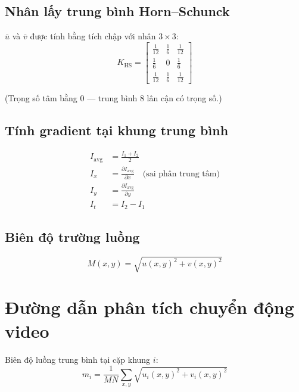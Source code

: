 \documentclass[12pt, a4paper]{article}
\begin{document}
\subsection{Nhân lấy trung bình Horn--Schunck}

$\bar{u}$ và $\bar{v}$ được tính bằng tích chập với nhân $3\times 3$:
\begin{equation}
  K_{\mathrm{HS}} =
  \begin{bmatrix}
    \tfrac{1}{12} & \tfrac{1}{6} & \tfrac{1}{12} \\[4pt]
    \tfrac{1}{6}  & 0            & \tfrac{1}{6}  \\[4pt]
    \tfrac{1}{12} & \tfrac{1}{6} & \tfrac{1}{12}
  \end{bmatrix}
  \label{eq:hs_kernel}
\end{equation}

(Trọng số tâm bằng $0$ --- trung bình $8$ lân cận có trọng số.)

\subsection{Tính gradient tại khung trung bình}

\begin{align}
  I_{\mathrm{avg}} &= \frac{I_1 + I_2}{2} \label{eq:grad_avg} \\[4pt]
  I_x &= \frac{\partial I_{\mathrm{avg}}}{\partial x}
         \quad \text{(sai phân trung tâm)} \label{eq:grad_x} \\[4pt]
  I_y &= \frac{\partial I_{\mathrm{avg}}}{\partial y} \label{eq:grad_y} \\[4pt]
  I_t &= I_2 - I_1 \label{eq:grad_t}
\end{align}

\subsection{Biên độ trường luồng}

\begin{equation}
  M(x,y) = \sqrt{u(x,y)^2 + v(x,y)^2}
  \label{eq:flow_magnitude}
\end{equation}

\section{Đường dẫn phân tích chuyển động video}

Biên độ luồng trung bình tại cặp khung $i$:
\begin{equation}
  m_i = \frac{1}{MN}\sum_{x,y} \sqrt{u_i(x,y)^2 + v_i(x,y)^2}
  \label{eq:mean_motion}
\end{equation}
\end{document}
